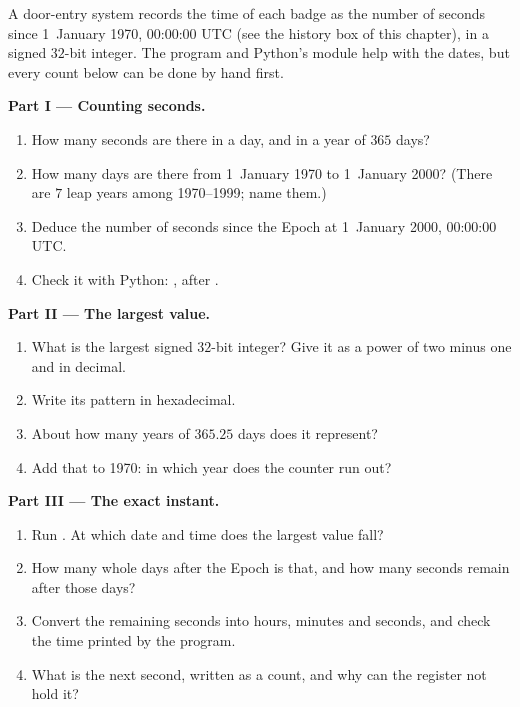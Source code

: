 \begin{problem}\label{pb:g10:machine-integers:1}
A door-entry system records the time of each badge as the number of seconds since 1~January 1970, 00:00:00 UTC (see
the history box of this chapter), in a signed $32$-bit integer. The program  and
Python's  module help with the dates, but every count below can be done by hand first.

\medskip\noindent\textbf{Part I --- Counting seconds.}
\begin{enumerate}
  \item How many seconds are there in a day, and in a year of $365$ days?
  \item How many days are there from 1~January 1970 to 1~January 2000? (There are $7$ leap years among
    1970--1999; name them.)
  \item Deduce the number of seconds since the Epoch at 1~January 2000, 00:00:00 UTC.
  \item Check it with Python: , after
    .
\end{enumerate}

\medskip\noindent\textbf{Part II --- The largest value.}
\begin{enumerate}[resume]
  \item What is the largest signed $32$-bit integer? Give it as a power of two minus one and in decimal.
  \item Write its pattern in hexadecimal.
  \item About how many years of $365.25$ days does it represent?
  \item Add that to 1970: in which year does the counter run out?
\end{enumerate}

\medskip\noindent\textbf{Part III --- The exact instant.}
\begin{enumerate}[resume]
  \item Run . At which date and time does the largest value fall?
  \item How many whole days after the Epoch is that, and how many seconds remain after those days?
  \item Convert the remaining seconds into hours, minutes and seconds, and check the time printed by the program.
  \item What is the next second, written as a count, and why can the register not hold it?
\end{enumerate}


\end{problem}
